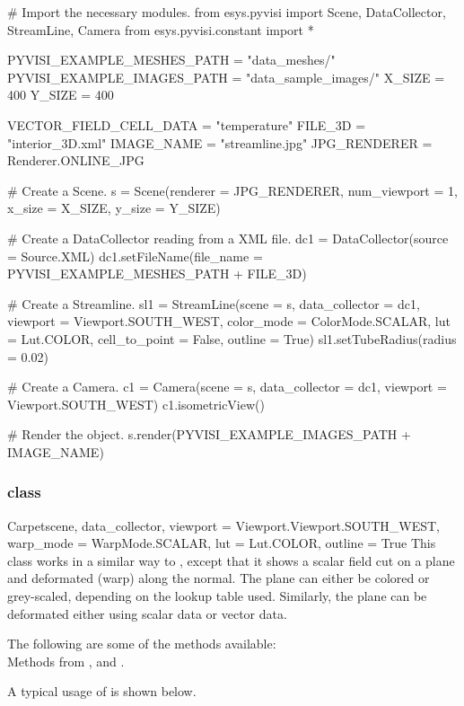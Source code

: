 \begin{python}
# Import the necessary modules.
from esys.pyvisi import Scene, DataCollector, StreamLine, Camera 
from esys.pyvisi.constant import *

PYVISI_EXAMPLE_MESHES_PATH = "data_meshes/"
PYVISI_EXAMPLE_IMAGES_PATH = "data_sample_images/"
X_SIZE = 400
Y_SIZE = 400

VECTOR_FIELD_CELL_DATA = "temperature"
FILE_3D = "interior_3D.xml"
IMAGE_NAME = "streamline.jpg"
JPG_RENDERER = Renderer.ONLINE_JPG


# Create a Scene.
s = Scene(renderer = JPG_RENDERER, num_viewport = 1, x_size = X_SIZE, 
        y_size = Y_SIZE)

# Create a DataCollector reading from a XML file.
dc1 = DataCollector(source = Source.XML)
dc1.setFileName(file_name = PYVISI_EXAMPLE_MESHES_PATH + FILE_3D)

# Create a Streamline.
sl1 = StreamLine(scene = s, data_collector = dc1,
        viewport = Viewport.SOUTH_WEST, color_mode = ColorMode.SCALAR, 
        lut = Lut.COLOR, cell_to_point = False, outline = True)
sl1.setTubeRadius(radius = 0.02)

# Create a Camera.
c1 = Camera(scene = s, data_collector = dc1, viewport = Viewport.SOUTH_WEST)
c1.isometricView()

# Render the object.
s.render(PYVISI_EXAMPLE_IMAGES_PATH + IMAGE_NAME)
\end{python}

\subsubsection{\Carpet class}

\begin{classdesc}{Carpet}{scene, data_collector,
viewport = Viewport.Viewport.SOUTH_WEST, warp_mode = WarpMode.SCALAR, 
lut = Lut.COLOR, outline = True}
This class works in a similar way to \MapOnPlaneCut, except that it shows a 
scalar field cut on a plane and deformated (warp) along the normal. The 
plane can either be colored or grey-scaled, depending on the lookup table used. 
Similarly, the plane can be deformated either using scalar data or vector data.
\end{classdesc}

The following are some of the methods available:\\
Methods from \ActorThreeD, \Warp and \Transform.

A typical usage of \Carpet is shown below.


